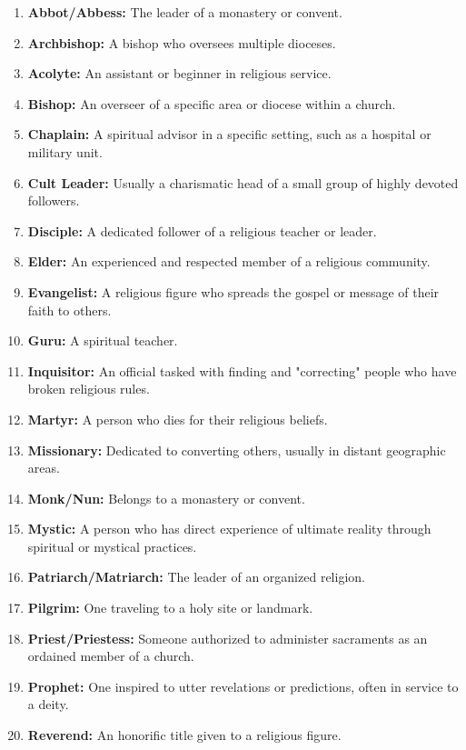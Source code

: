 \documentclass[12pt]{book}
\begin{document}
\begin{enumerate}
    \item \textbf{Abbot/Abbess:} The leader of a monastery or convent.
    \item \textbf{Archbishop:} A bishop who oversees multiple dioceses.
    \item \textbf{Acolyte:} An assistant or beginner in religious service.
    \item \textbf{Bishop:} An overseer of a specific area or diocese within a church.
    \item \textbf{Chaplain:} A spiritual advisor in a specific setting, such as a hospital or military unit.
    \item \textbf{Cult Leader:} Usually a charismatic head of a small group of highly devoted followers.
    \item \textbf{Disciple:} A dedicated follower of a religious teacher or leader.
    \item \textbf{Elder:} An experienced and respected member of a religious community.
    \item \textbf{Evangelist:} A religious figure who spreads the gospel or message of their faith to others.
    \item \textbf{Guru:} A spiritual teacher.
    \item \textbf{Inquisitor:} An official tasked with finding and "correcting" people who have broken religious rules.
    \item \textbf{Martyr:} A person who dies for their religious beliefs.
    \item \textbf{Missionary:} Dedicated to converting others, usually in distant geographic areas.
    \item \textbf{Monk/Nun:} Belongs to a monastery or convent.
    \item \textbf{Mystic:} A person who has direct experience of ultimate reality through spiritual or mystical practices.
    \item \textbf{Patriarch/Matriarch:} The leader of an organized religion.
    \item \textbf{Pilgrim:} One traveling to a holy site or landmark.
    \item \textbf{Priest/Priestess:} Someone authorized to administer sacraments as an ordained member of a church.
    \item \textbf{Prophet:} One inspired to utter revelations or predictions, often in service to a deity.
    \item \textbf{Reverend:} An honorific title given to a religious figure.

\end{enumerate}
\end{document}
